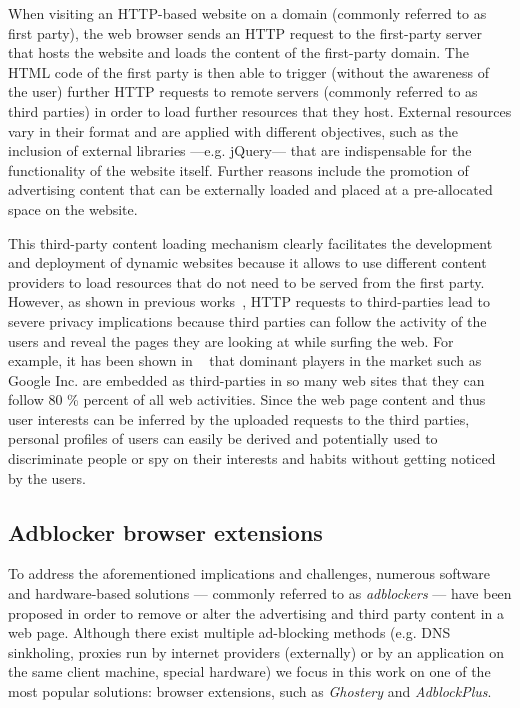 \documentclass[compsoc, conference, letterpaper, 10pt, times]{IEEEtran}
\begin{document}
When visiting an HTTP-based website on a domain (commonly referred to as first party), the web browser sends an HTTP request to the first-party server that hosts the website and loads the content of the first-party domain. The HTML code of the first party is then able to trigger (without the awareness of the user) further HTTP requests to remote servers (commonly referred to as third parties) in order to load further resources that they host. External resources vary in their format and are applied with different objectives, such as the inclusion of external libraries ---e.g. jQuery--- that are indispensable for the functionality of the website itself. Further reasons include the promotion of advertising content that can be externally loaded and placed at a pre-allocated space on the website.

This third-party content loading mechanism clearly facilitates the development and deployment of dynamic websites because it allows to use different content providers to load resources that do not need to be served from the first party. However, as shown in previous works~\cite{mayer,barford, krishnamurthy_privacy_diffusion, soltani}, HTTP requests to third-parties lead to severe privacy implications because third parties can follow the activity of the users and reveal the pages they are looking at while surfing the web. For example, it has been shown in ~\cite{Gill13} that dominant players in the market such as Google Inc. are embedded as third-parties in so many web sites that they can follow 80 \% percent of all web activities. Since the web page content and thus user interests can be inferred by the uploaded requests to the third parties, personal profiles of users can easily be derived and potentially used to discriminate people or spy on their interests and habits without getting noticed by the users. 

\subsection{Adblocker browser extensions}



To address the aforementioned implications and challenges, numerous software and hardware-based solutions --- commonly referred to as \textit{adblockers} --- have been proposed in order to remove or alter the advertising and third party content in a web page. Although there exist multiple ad-blocking methods (e.g. DNS sinkholing, proxies run by internet providers (externally) or by an application on the same client machine, special hardware) we focus in this work on one of the most popular solutions: browser extensions, such as \textit{Ghostery} and \textit{AdblockPlus}.
\end{document}
